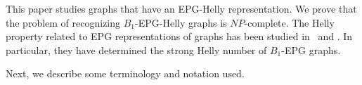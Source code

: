 \documentclass[runningheads]{llncs}
\begin{document}







This paper studies graphs that have an EPG-Helly representation. We prove that the problem of recognizing $ B_1$-EPG-Helly graphs is $NP$-complete.   The Helly property related to EPG representations of graphs has been studied in~\cite{golumbic2009} and \cite{golumbic2013}. In particular, they have determined the strong Helly number of $B_1$-EPG graphs. 


 
 
 Next, we describe some terminology and notation used.

\end{document}
